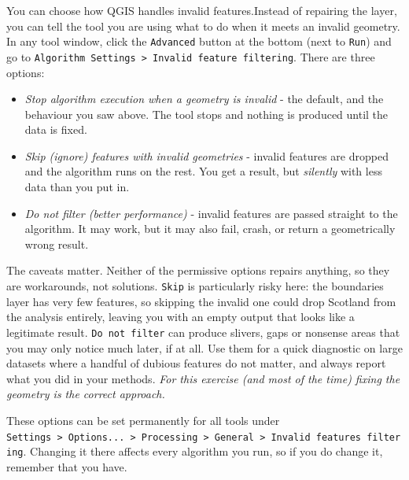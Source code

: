 \documentclass[
  letterpaper,
  DIV=11,
  numbers=noendperiod]{scrreprt}
\providecommand{\tightlist}{%
  \setlength{\itemsep}{0pt}\setlength{\parskip}{0pt}}\usepackage{longtable,booktabs,array}
\begin{document}
\begin{tcolorbox}[enhanced jigsaw, breakable, toptitle=1mm, colback=white, left=2mm, leftrule=.75mm, titlerule=0mm, colframe=quarto-callout-tip-color-frame, opacityback=0, title=\textcolor{quarto-callout-tip-color}{\faLightbulb}\hspace{0.5em}{(Advanced) Changing QGIS behaviour}, toprule=.15mm, opacitybacktitle=0.6, bottomtitle=1mm, colbacktitle=quarto-callout-tip-color!10!white, bottomrule=.15mm, coltitle=black, rightrule=.15mm, arc=.35mm]

You can choose how QGIS handles invalid features.Instead of repairing
the layer, you can tell the tool you are using what to do when it meets
an invalid geometry. In any tool window, click the \texttt{Advanced}
button at the bottom (next to \texttt{Run}) and go to
\texttt{Algorithm\ Settings\ \textgreater{}\ Invalid\ feature\ filtering}.
There are three options:

\begin{itemize}
\tightlist
\item
  \emph{Stop algorithm execution when a geometry is invalid} - the
  default, and the behaviour you saw above. The tool stops and nothing
  is produced until the data is fixed.
\item
  \emph{Skip (ignore) features with invalid geometries} - invalid
  features are dropped and the algorithm runs on the rest. You get a
  result, but \emph{silently} with less data than you put in.
\item
  \emph{Do not filter (better performance)} - invalid features are
  passed straight to the algorithm. It may work, but it may also fail,
  crash, or return a geometrically wrong result.
\end{itemize}

The caveats matter. Neither of the permissive options repairs anything,
so they are workarounds, not solutions. \texttt{Skip} is particularly
risky here: the boundaries layer has very few features, so skipping the
invalid one could drop Scotland from the analysis entirely, leaving you
with an empty output that looks like a legitimate result.
\texttt{Do\ not\ filter} can produce slivers, gaps or nonsense areas
that you may only notice much later, if at all. Use them for a quick
diagnostic on large datasets where a handful of dubious features do not
matter, and always report what you did in your methods. \emph{For this
exercise (and most of the time) fixing the geometry is the correct
approach.}

These options can be set permanently for all tools under
\texttt{Settings\ \textgreater{}\ Options...\ \textgreater{}\ Processing\ \textgreater{}\ General\ \textgreater{}\ Invalid\ features\ filtering}.
Changing it there affects every algorithm you run, so if you do change
it, remember that you have.

\end{tcolorbox}
\end{document}

